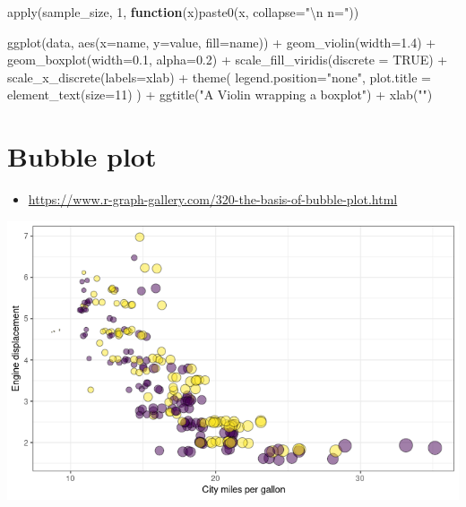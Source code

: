 \documentclass[
]{book}
\newenvironment{Shaded}{\begin{snugshade}}{\end{snugshade}}
\newcommand{\AttributeTok}[1]{\textcolor[rgb]{0.77,0.63,0.00}{#1}}
\newcommand{\ConstantTok}[1]{\textcolor[rgb]{0.00,0.00,0.00}{#1}}
\newcommand{\ControlFlowTok}[1]{\textcolor[rgb]{0.13,0.29,0.53}{\textbf{#1}}}
\newcommand{\DecValTok}[1]{\textcolor[rgb]{0.00,0.00,0.81}{#1}}
\newcommand{\FloatTok}[1]{\textcolor[rgb]{0.00,0.00,0.81}{#1}}
\newcommand{\FunctionTok}[1]{\textcolor[rgb]{0.00,0.00,0.00}{#1}}
\newcommand{\NormalTok}[1]{#1}
\newcommand{\SpecialCharTok}[1]{\textcolor[rgb]{0.00,0.00,0.00}{#1}}
\newcommand{\StringTok}[1]{\textcolor[rgb]{0.31,0.60,0.02}{#1}}
\providecommand{\tightlist}{%
  \setlength{\itemsep}{0pt}\setlength{\parskip}{0pt}}
\begin{document}
\begin{Shaded}
\begin{Highlighting}[]
\FunctionTok{apply}\NormalTok{(sample\_size, }\DecValTok{1}\NormalTok{, }\ControlFlowTok{function}\NormalTok{(x)}\FunctionTok{paste0}\NormalTok{(x, }\AttributeTok{collapse=}\StringTok{"}\SpecialCharTok{\textbackslash{}n}\StringTok{ n="}\NormalTok{))}

\FunctionTok{ggplot}\NormalTok{(data, }\FunctionTok{aes}\NormalTok{(}\AttributeTok{x=}\NormalTok{name, }\AttributeTok{y=}\NormalTok{value, }\AttributeTok{fill=}\NormalTok{name)) }\SpecialCharTok{+}
    \FunctionTok{geom\_violin}\NormalTok{(}\AttributeTok{width=}\FloatTok{1.4}\NormalTok{) }\SpecialCharTok{+}
    \FunctionTok{geom\_boxplot}\NormalTok{(}\AttributeTok{width=}\FloatTok{0.1}\NormalTok{, }\AttributeTok{alpha=}\FloatTok{0.2}\NormalTok{) }\SpecialCharTok{+}
    \FunctionTok{scale\_fill\_viridis}\NormalTok{(}\AttributeTok{discrete =} \ConstantTok{TRUE}\NormalTok{) }\SpecialCharTok{+}
    \FunctionTok{scale\_x\_discrete}\NormalTok{(}\AttributeTok{labels=}\NormalTok{xlab) }\SpecialCharTok{+}
    \FunctionTok{theme}\NormalTok{(}
      \AttributeTok{legend.position=}\StringTok{"none"}\NormalTok{,}
      \AttributeTok{plot.title =} \FunctionTok{element\_text}\NormalTok{(}\AttributeTok{size=}\DecValTok{11}\NormalTok{)}
\NormalTok{    ) }\SpecialCharTok{+}
    \FunctionTok{ggtitle}\NormalTok{(}\StringTok{"A Violin wrapping a boxplot"}\NormalTok{) }\SpecialCharTok{+}
    \FunctionTok{xlab}\NormalTok{(}\StringTok{""}\NormalTok{)}
\end{Highlighting}
\end{Shaded}

\hypertarget{bubble-plot}{%
\section{Bubble plot}\label{bubble-plot}}

\begin{itemize}
\tightlist
\item
  \url{https://www.r-graph-gallery.com/320-the-basis-of-bubble-plot.html}
\end{itemize}

\includegraphics{images/10/000049.png}
\end{document}
